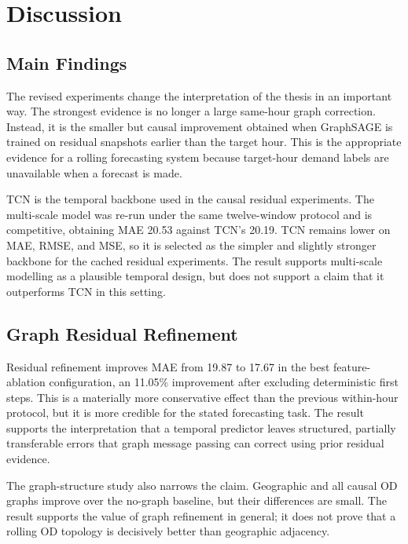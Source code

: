 \documentclass[12pt,a4paper]{report}
\begin{document}
	\chapter{Discussion}
	\label{sec:discussion}
	
	\section{Main Findings}
	
	The revised experiments change the interpretation of the thesis in an important way. The strongest evidence is no longer a large same-hour graph correction. Instead, it is the smaller but causal improvement obtained when GraphSAGE is trained on residual snapshots earlier than the target hour. This is the appropriate evidence for a rolling forecasting system because target-hour demand labels are unavailable when a forecast is made.
	
	TCN is the temporal backbone used in the causal residual experiments. The multi-scale model was re-run under the same twelve-window protocol and is competitive, obtaining MAE 20.53 against TCN's 20.19. TCN remains lower on MAE, RMSE, and MSE, so it is selected as the simpler and slightly stronger backbone for the cached residual experiments. The result supports multi-scale modelling as a plausible temporal design, but does not support a claim that it outperforms TCN in this setting.
	
	\section{Graph Residual Refinement}
	
	Residual refinement improves MAE from 19.87 to 17.67 in the best feature-ablation configuration, an 11.05\% improvement after excluding deterministic first steps. This is a materially more conservative effect than the previous within-hour protocol, but it is more credible for the stated forecasting task. The result supports the interpretation that a temporal predictor leaves structured, partially transferable errors that graph message passing can correct using prior residual evidence.
	
The graph-structure study also narrows the claim. Geographic and all causal OD graphs improve over the no-graph baseline, but their differences are small. The result supports the value of graph refinement in general; it does not prove that a rolling OD topology is decisively better than geographic adjacency.
	
\end{document}

